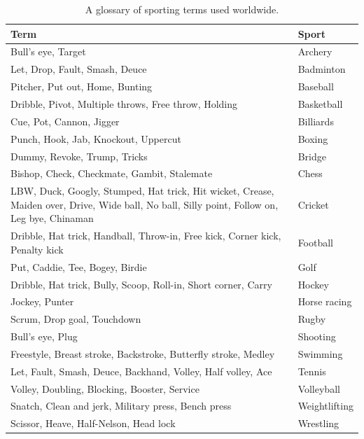 \documentclass[
  openany]{book}
\begin{document}
\begin{table}

\caption{\label{tab:sporting-terminologies}A glossary of sporting terms used worldwide.}
\centering
\begin{tabular}[t]{ll}
\toprule
Term & Sport\\
\midrule
\rowcolor{gray!6}  Bull's eye, Target & Archery\\
Let, Drop, Fault, Smash, Deuce & Badminton\\
\rowcolor{gray!6}  Pitcher, Put out, Home, Bunting & Baseball\\
Dribble, Pivot, Multiple throws, Free throw, Holding & Basketball\\
\rowcolor{gray!6}  Cue, Pot, Cannon, Jigger & Billiards\\
\addlinespace
Punch, Hook, Jab, Knockout, Uppercut & Boxing\\
\rowcolor{gray!6}  Dummy, Revoke, Trump, Tricks & Bridge\\
Bishop, Check, Checkmate, Gambit, Stalemate & Chess\\
\rowcolor{gray!6}  LBW, Duck, Googly, Stumped, Hat trick, Hit wicket, Crease, Maiden over, Drive, Wide ball, No ball, Silly point, Follow on, Leg bye, Chinaman & Cricket\\
Dribble, Hat trick, Handball, Throw-in, Free kick, Corner kick, Penalty kick & Football\\
\addlinespace
\rowcolor{gray!6}  Put, Caddie, Tee, Bogey, Birdie & Golf\\
Dribble, Hat trick, Bully, Scoop, Roll-in, Short corner, Carry & Hockey\\
\rowcolor{gray!6}  Jockey, Punter & Horse racing\\
Scrum, Drop goal, Touchdown & Rugby\\
\rowcolor{gray!6}  Bull's eye, Plug & Shooting\\
\addlinespace
Freestyle, Breast stroke, Backstroke, Butterfly stroke, Medley & Swimming\\
\rowcolor{gray!6}  Let, Fault, Smash, Deuce, Backhand, Volley, Half volley, Ace & Tennis\\
Volley, Doubling, Blocking, Booster, Service & Volleyball\\
\rowcolor{gray!6}  Snatch, Clean and jerk, Military press, Bench press & Weightlifting\\
Scissor, Heave, Half-Nelson, Head lock & Wrestling\\
\bottomrule
\end{tabular}
\end{table}
\end{document}
